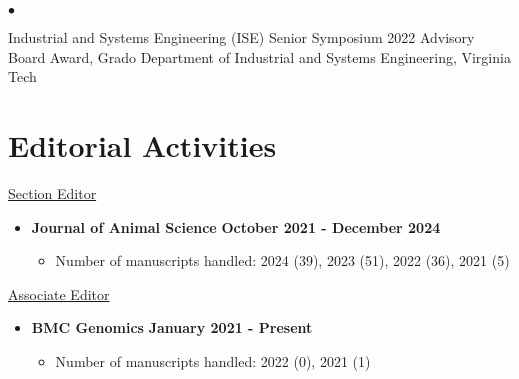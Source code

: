 \documentclass[margin,line,10pt]{res}
\newenvironment{list2}{
  \begin{list}{$\bullet$}{%
      \setlength{\itemsep}{0in}
      \setlength{\parsep}{0in} \setlength{\parskip}{0in}
      \setlength{\topsep}{0in} \setlength{\partopsep}{0in} 
      \setlength{\leftmargin}{0.2in}}}{\end{list}}
\begin{document}
\begin{resume}
\vspace{0.2cm}

\section{}
\begin{list2}
  \item Industrial and Systems Engineering (ISE) Senior Symposium 2022 Advisory Board Award, Grado Department of Industrial and Systems Engineering, Virginia Tech 
\end{list2}



\vspace{0.5cm}
\section{\sc Editorial Activities}


\underline{Section Editor}
\vspace{0.2cm}

\begin{itemize}
\item {\bf Journal of Animal Science} \hfill {\bf October 2021 - December 2024}
  \begin{itemize}
    \item Number of manuscripts handled: 2024 (39), 2023 (51), 2022 (36), 2021 (5)
  \end{itemize}
\end{itemize}


\underline{Associate Editor}
\vspace{0.2cm}




\begin{itemize}
\item {\bf BMC Genomics} \hfill {\bf January 2021 - Present}
  \begin{itemize}
    \item Number of manuscripts handled: 2022 (0), 2021 (1)
  \end{itemize}
\end{itemize}


\end{resume}
\end{document}
